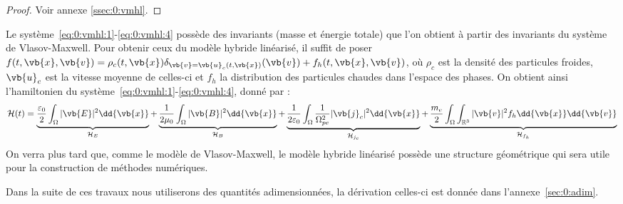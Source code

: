 \begin{proof}
  Voir annexe \ref{ssec:0:vmhl}.
\end{proof}

Le système~\eqref{eq:0:vmhl:1}-\eqref{eq:0:vmhl:4} possède des invariants (masse et énergie totale) que l'on obtient à partir des invariants du système de Vlasov-Maxwell. Pour obtenir ceux du modèle hybride linéarisé, il suffit de poser $f(t,\vb{x},\vb{v})=\rho_c(t,\vb{x})\delta_{\vb{v}=\vb{u}_c(t,\vb{x})}(\vb{v}) + f_h(t,\vb{x},\vb{v})$, où $\rho_c$ est la densité des particules froides, $\vb{u}_c$ est la vitesse moyenne de celles-ci et $f_h$ la distribution des particules chaudes dans l'espace des phases. On obtient ainsi l'hamiltonien du système~\eqref{eq:0:vmhl:1}-\eqref{eq:0:vmhl:4}, donné par :
\begin{equation}
  \mathcal{H}(t) = \underbrace{\frac{\varepsilon_0}{2} \int_{\Omega} |\vb{E}|^2 \dd{\vb{x}} }_{\mathcal{H}_E}
              + \underbrace{\frac{1}{2\mu_0}        \int_{\Omega} |\vb{B}|^2 \dd{\vb{x}} }_{\mathcal{H}_B}
              + \underbrace{\frac{1}{2\varepsilon_0}\int_{\Omega} \frac{1}{\Omega_{pe}^2}|\vb{j}_c|^2 \dd{\vb{x}} }_{\mathcal{H}_{j_c}}
              + \underbrace{\frac{m_e}{2}           \int_{\Omega}\int_{\mathbb{R}^3} |\vb{v}|^2f_h \dd{\vb{x}}\dd{\vb{v}} }_{\mathcal{H}_{f_h}}
\end{equation}
On verra plus tard que, comme le modèle de Vlasov-Maxwell, le modèle hybride linéarisé possède une structure géométrique qui sera utile pour la construction de méthodes numériques.

Dans la suite de ces travaux nous utiliserons des quantités adimensionnées, la dérivation celles-ci est donnée dans l'annexe~\ref{sec:0:adim}.

